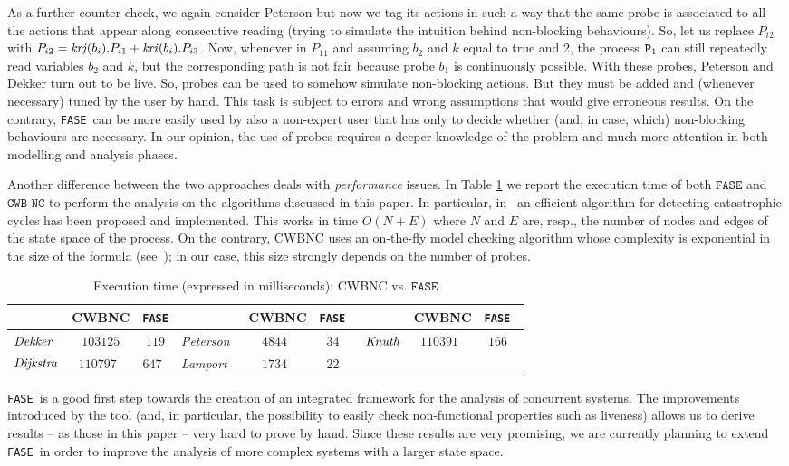 \documentclass[copyright,creativecommons]{eptcs}
\newcommand{\fase}{\texttt{FASE}}
\newcommand{\cwbnc}{\texttt{CWB-NC}}
\newcommand{\rk}[1]{{\it kr #1}}
\newcommand{\dekker}{{\it Dekker}}
\newcommand{\dijkstra}{{\it Dijkstra}}
\newcommand{\knuth}{{\it Knuth}}
\newcommand{\peterson}{{\it Peterson}}
\newcommand{\lamport}{{\it Lamport}}
\newcommand{\proc}{{\tt P}}
\begin{document}
As a further counter-check, we again consider Peterson but now we tag its
actions in such a way that the same probe is associated to all the  actions
that appear along consecutive reading (trying to simulate the intuition
behind non-blocking behaviours). So, let us replace $P_{i2}$ with 
$P_{i2}= \rk{j}(b_{i}).P_{i1} + \rk{i}(b_{i}).P_{i3}$. 
Now, whenever in $P_{11}$ and assuming $b_2$ and $k$ equal to true and 2,
the process $\proc_1$ can still repeatedly read variables $b_2$ and
$k$, but the corresponding path is not fair because probe $b_1$ is
continuously possible. With these probes, Peterson and Dekker turn out to
be live.
So, probes can be used to somehow simulate non-blocking actions. But they
must be added and (whenever necessary) tuned by the user by hand. This
task is subject to errors and wrong assumptions that would give erroneous
results.  On the contrary, \fase\ can be more easily used by also a
non-expert user that has only to decide whether (and, in case,
which) non-blocking behaviours are necessary. In our opinion, the use of
probes requires a deeper knowledge of the problem and much
more attention in both modelling and analysis phases. 

Another difference between the two approaches deals with {\em performance}
issues. In Table \ref{tab:comparing3} we report the execution time of both $\fase$ and $\cwbnc$ to perform the analysis on the algorithms discussed in this paper. 
In particular, in~\cite{BCCDV09} an efficient algorithm for detecting catastrophic
cycles has been proposed and implemented. This works in time $O(N + E)$
where $N$ and $E$ are, resp., the number of nodes and edges of the
state space of the process. On the contrary, CWBNC uses an on-the-fly model
checking algorithm whose complexity is exponential in the size of the
formula (see~\cite{CLS00}); in our case, this size strongly depends
on the number of probes.

\begin{table}
\centering
\small
\begin{tabular}{l c c l c c l c c}
 & CWBNC & \fase & &  CWBNC & \fase\  & &  CWBNC & \fase\  \\ \hline
\midrule
$\dekker$ & $103125$  & $119$ & \peterson\ & $4844$\ & $34$\
& $\knuth$ & $110391$\ & $166$\ \\
$\dijkstra$ & $110797$\ & $647$\ & \lamport\ & $1734$\ & $22$\ \\
\midrule
\end{tabular}
\caption{Execution time (expressed in milliseconds): CWBNC vs. $\fase$}
\label{tab:comparing3}
\end{table}

\fase\ is a good first step towards the creation of an integrated
framework for the analysis of concurrent systems. The improvements
introduced by the tool (and, in particular, the possibility to easily
check non-functional properties such as liveness) allows us to derive
results -- as those in this paper -- very hard to prove by hand. Since
these results are very promising, we are currently planning to extend
\fase\ in order to improve the analysis of more complex systems with a
larger state space.



\end{document}
